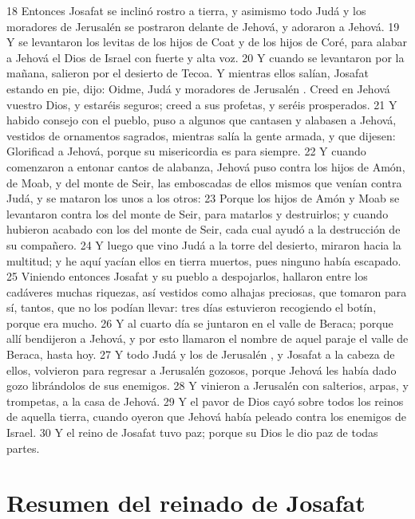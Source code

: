 18 Entonces Josafat se inclinó rostro a tierra, y asimismo todo Judá y los moradores de Jerusalén  se postraron delante de Jehová, y adoraron a Jehová.
19 Y se levantaron los levitas de los hijos de Coat y de los hijos de Coré, para alabar a Jehová el Dios de Israel con fuerte y alta voz.
20 Y cuando se levantaron por la mañana, salieron por el desierto de Tecoa. Y mientras ellos salían, Josafat estando en pie, dijo: Oidme, Judá y moradores de Jerusalén . Creed en Jehová vuestro Dios, y estaréis seguros; creed a sus profetas, y seréis prosperados.
21 Y habido consejo con el pueblo, puso a algunos que cantasen y alabasen a Jehová, vestidos de ornamentos sagrados, mientras salía la gente armada, y que dijesen: Glorificad a Jehová, porque su misericordia es para siempre.
22 Y cuando comenzaron a entonar cantos de alabanza, Jehová puso contra los hijos de Amón, de Moab, y del monte de Seir, las emboscadas de ellos mismos que venían contra Judá, y se mataron los unos a los otros:
23 Porque los hijos de Amón y Moab se levantaron contra los del monte de Seir, para matarlos y destruirlos; y cuando hubieron acabado con los del monte de Seir, cada cual ayudó a la destrucción de su compañero.
24 Y luego que vino Judá a la torre del desierto, miraron hacia la multitud; y he aquí yacían ellos en tierra muertos, pues ninguno había escapado.
25 Viniendo entonces Josafat y su pueblo a despojarlos, hallaron entre los cadáveres  muchas riquezas, así vestidos como alhajas preciosas, que tomaron para sí, tantos, que no los podían llevar: tres días estuvieron recogiendo el botín, porque era mucho.
26 Y al cuarto día se juntaron en el valle de Beraca; porque allí bendijeron a Jehová, y por esto llamaron el nombre de aquel paraje el valle de Beraca, hasta hoy.
27 Y todo Judá y los de Jerusalén , y Josafat a la cabeza de ellos, volvieron para regresar a Jerusalén  gozosos, porque Jehová les había dado gozo librándolos de sus enemigos.
28 Y vinieron a Jerusalén  con salterios, arpas, y trompetas, a la casa de Jehová.
29 Y el pavor de Dios cayó sobre todos los reinos de aquella tierra, cuando oyeron que Jehová había peleado contra los enemigos de Israel.
30 Y el reino de Josafat tuvo paz; porque su Dios le dio paz de todas partes.

\section*{Resumen del reinado de Josafat}

